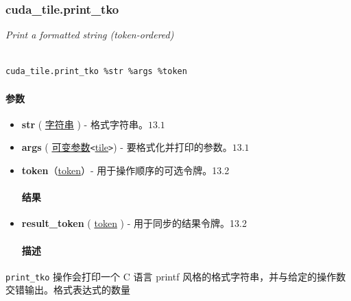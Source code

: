 \documentclass{article}
\begin{document}
\subsubsection{cuda\_tile.print\_tko}


\textit{Print a formatted string (token-ordered)}




\begin{lstlisting}

cuda_tile.print_tko %str %args %token

\end{lstlisting}



\paragraph{参数}


\begin{itemize}
\item \textbf{str} ( \href{https://docs.nvidia.com/cuda/tile-ir/latest/sections/operations.html#type-string}{字符串} ) - 格式字符串。$\boxed{13.1}$
\item \textbf{args} ( \href{https://docs.nvidia.com/cuda/tile-ir/latest/sections/operations.html#type-variadic}{可变参数}\texttt{<}\href{https://docs.nvidia.com/cuda/tile-ir/latest/sections/types.html#type-tile}{tile}\texttt{>}) - 要格式化并打印的参数。$\boxed{13.1}$
\item \textbf{token}（\href{https://docs.nvidia.com/cuda/tile-ir/latest/sections/operations.html#type-token}{token}）- 用于操作顺序的可选令牌。13.2




\paragraph{结果}


\item \textbf{result\_token} ( \href{https://docs.nvidia.com/cuda/tile-ir/latest/sections/operations.html#type-token}{token} ) - 用于同步的结果令牌。13.2




\paragraph{描述}


\end{itemize}
\texttt{print\_tko} 操作会打印一个 C 语言 printf 风格的格式字符串，并与给定的操作数交错输出。格式表达式的数量
\end{document}
